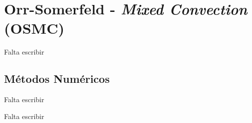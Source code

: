 \section{Orr-Somerfeld - \textit{Mixed Convection} (OSMC)}
Falta escribir

\subsection{Métodos Numéricos}
Falta escribir

Falta escribir

